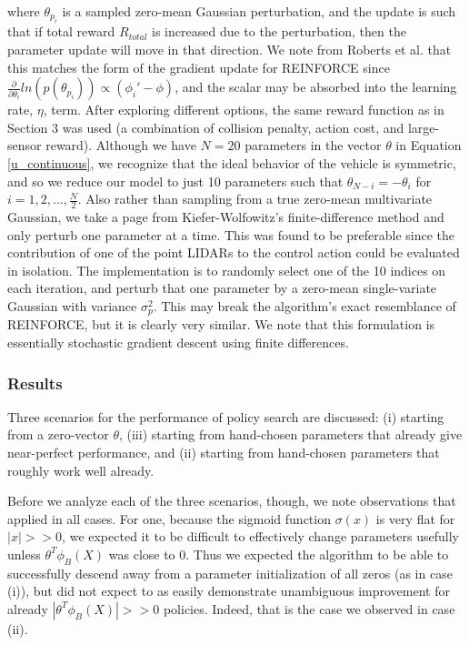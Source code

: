 \documentclass{article}
\begin{document}
where $\theta_{p_i}$ is a sampled zero-mean Gaussian perturbation, and the update is such that if total reward $R_{total}$ is increased due to the perturbation, then the parameter update will move in that direction.  We note from Roberts et al. that this matches the form of the gradient update for REINFORCE since $\frac{\partial}{\partial \theta_i} ln (p(\theta_{p_i} )) \propto (\phi_i' -\phi)$, and the scalar may be absorbed into the learning rate, $\eta$, term.  After exploring different options, the same reward function as in Section 3 was used (a combination of collision penalty, action cost, and large-sensor reward).  Although we have $N=20$ parameters in the vector $\theta$ in Equation \ref{u_continuous}, we recognize that the ideal behavior of the vehicle is symmetric, and so we reduce our model to just 10 parameters such that $\theta_{N-i} = - \theta_{i} $ for $i = 1,2,..., \frac{N}{2}$.  Also rather than sampling from a true zero-mean multivariate Gaussian, we take a page from Kiefer-Wolfowitz's finite-difference method and only perturb one parameter at a time.  This was found to be preferable since the contribution of one of the point LIDARs to the control action could be evaluated in isolation.  The implementation is to randomly select one of the 10 indices on each iteration, and perturb that one parameter by a zero-mean single-variate Gaussian with variance $\sigma_p^2$.  This may break the algorithm's exact resemblance of REINFORCE, but it is clearly very similar.  We note that this formulation is essentially stochastic gradient descent using finite differences.

\subsubsection{Results}

Three scenarios for the performance of policy search are discussed: (i) starting from a zero-vector $\theta$, (iii) starting from hand-chosen parameters that already give near-perfect performance, and (ii) starting from hand-chosen parameters that roughly work well already.

Before we analyze each of the three scenarios, though, we note observations that applied in all cases.  For one, because the sigmoid function $\sigma(x)$ is very flat for $|x|>>0$, we expected it to be difficult to effectively change parameters usefully unless $\theta^T \phi_B(X)$ was close to 0.  Thus we expected the algorithm to be able to successfully descend away from a parameter initialization of all zeros (as in case (i)), but did not expect to as easily demonstrate unambiguous improvement for already $|\theta^T \phi_B(X)| >> 0$ policies.  Indeed, that is the case we observed in case (ii).
\end{document}
